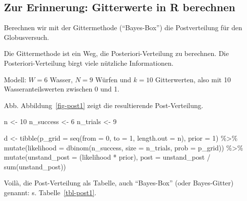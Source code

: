 \documentclass[
  a4paper,
  DIV=11]{scrreprt}
\newenvironment{Shaded}{\begin{snugshade}}{\end{snugshade}}
\newcommand{\AttributeTok}[1]{\textcolor[rgb]{0.40,0.45,0.13}{#1}}
\newcommand{\DecValTok}[1]{\textcolor[rgb]{0.68,0.00,0.00}{#1}}
\newcommand{\FunctionTok}[1]{\textcolor[rgb]{0.28,0.35,0.67}{#1}}
\newcommand{\NormalTok}[1]{\textcolor[rgb]{0.00,0.23,0.31}{#1}}
\newcommand{\OtherTok}[1]{\textcolor[rgb]{0.00,0.23,0.31}{#1}}
\newcommand{\SpecialCharTok}[1]{\textcolor[rgb]{0.37,0.37,0.37}{#1}}
\theoremstyle{definition}
\theoremstyle{remark}
\begin{document}
\hypertarget{zur-erinnerung-gitterwerte-in-r-berechnen}{%
\subsection{Zur Erinnerung: Gitterwerte in R
berechnen}\label{zur-erinnerung-gitterwerte-in-r-berechnen}}

Berechnen wir mit der Gittermethode (``Bayes-Box'') die Postverteilung
für den Globusversuch.

Die Gittermethode ist ein Weg, die Posteriori-Verteilung zu berechnen.
Die Posteriori-Verteilung birgt viele nützliche Informationen.

Modell: \(W=6\) Wasser, \(N=9\) Würfen und \(k=10\) Gitterwerten, also
mit 10 Wasseranteilswerten zwischen 0 und 1.

Abb. Abbildung~\ref{fig-post1} zeigt die resultierende Post-Verteilung.

\begin{Shaded}
\begin{Highlighting}[]
\NormalTok{n }\OtherTok{\textless{}{-}} \DecValTok{10}
\NormalTok{n\_success }\OtherTok{\textless{}{-}} \DecValTok{6}
\NormalTok{n\_trials  }\OtherTok{\textless{}{-}} \DecValTok{9}

\NormalTok{d }\OtherTok{\textless{}{-}}
  \FunctionTok{tibble}\NormalTok{(}\AttributeTok{p\_grid =} \FunctionTok{seq}\NormalTok{(}\AttributeTok{from =} \DecValTok{0}\NormalTok{, }\AttributeTok{to =} \DecValTok{1}\NormalTok{, }\AttributeTok{length.out =}\NormalTok{ n),}
         \AttributeTok{prior  =} \DecValTok{1}\NormalTok{) }\SpecialCharTok{\%\textgreater{}\%} 
  \FunctionTok{mutate}\NormalTok{(}\AttributeTok{likelihood =} \FunctionTok{dbinom}\NormalTok{(n\_success, }
                             \AttributeTok{size =}\NormalTok{ n\_trials, }
                             \AttributeTok{prob =}\NormalTok{ p\_grid)) }\SpecialCharTok{\%\textgreater{}\%} 
  \FunctionTok{mutate}\NormalTok{(}\AttributeTok{unstand\_post =}\NormalTok{ (likelihood }\SpecialCharTok{*}\NormalTok{ prior),}
         \AttributeTok{post =}\NormalTok{ unstand\_post }\SpecialCharTok{/} \FunctionTok{sum}\NormalTok{(unstand\_post))}
\end{Highlighting}
\end{Shaded}

Voilà, die Post-Verteilung als Tabelle, auch ``Bayes-Box'' (oder
Bayes-Gitter) genannt: s. Tabelle~\ref{tbl-post1}.
\end{document}
